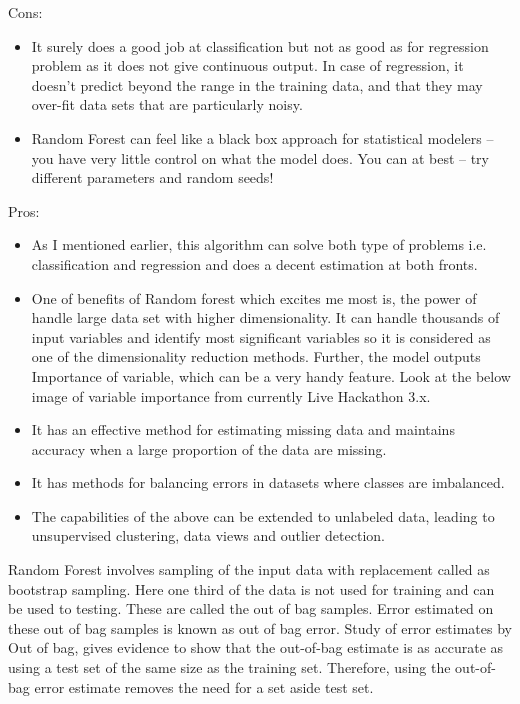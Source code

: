 Cons:
\begin{itemize}

\item It surely does a good job at classification but not as good as for regression problem as it does not give continuous output. In case of regression, it doesn’t predict beyond the range in the training data, and that they may over-fit data sets that are particularly noisy.

\item Random Forest can feel like a black box approach for statistical modelers – you have very little control on what the model does. You can at best – try different parameters and random seeds!
\end{itemize}

Pros:
\begin{itemize}

\item As I mentioned earlier, this algorithm can solve both type of problems i.e. classification and regression and does a decent estimation at both fronts.

\item One of benefits of Random forest which excites me most is, the power of handle large data set with higher dimensionality. It can handle thousands of input variables and identify most significant variables so it is considered as one of the dimensionality reduction methods. Further, the model outputs Importance of variable, which can be a very handy feature. Look at the below image of variable importance from currently Live Hackathon 3.x.

\item It has an effective method for estimating missing data and maintains accuracy when a large proportion of the data are missing.

\item It has methods for balancing errors in datasets where classes are imbalanced.

\item The capabilities of the above can be extended to unlabeled data, leading to unsupervised clustering, data views and outlier detection.
\end{itemize}

Random Forest involves sampling of the input data with replacement called as bootstrap sampling. Here one third of the data is not used for training and can be used to testing. These are called the out of bag samples. Error estimated on these out of bag samples is known as out of bag error. Study of error estimates by Out of bag, gives evidence to show that the out-of-bag estimate is as accurate as using a test set of the same size as the training set. Therefore, using the out-of-bag error estimate removes the need for a set aside test set.

